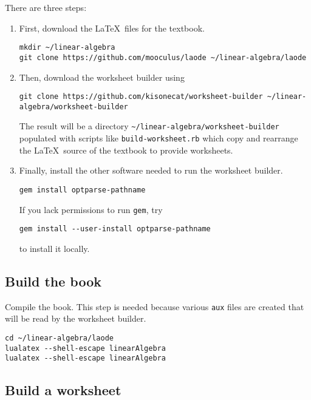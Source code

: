 \documentclass{article}
\begin{document}
There are three steps:
\begin{enumerate}[\bfseries(a)]
\item First, download the \LaTeX\ files for the textbook.

\begin{verbatim}
mkdir ~/linear-algebra
git clone https://github.com/mooculus/laode ~/linear-algebra/laode
\end{verbatim}

\item Then, download the worksheet builder using
\begin{verbatim}
git clone https://github.com/kisonecat/worksheet-builder ~/linear-algebra/worksheet-builder
\end{verbatim}
The result will be a directory
\verb|~/linear-algebra/worksheet-builder| populated with scripts like
\verb|build-worksheet.rb| which copy and rearrange the \LaTeX\ source
of the textbook to provide worksheets.

\item Finally, install the other software needed to run the worksheet builder.

\begin{verbatim}
gem install optparse-pathname
\end{verbatim}

If you lack permissions to run \texttt{gem}, try

\begin{verbatim}
gem install --user-install optparse-pathname
\end{verbatim}

to install it locally.
\end{enumerate}

\subsection{Build the book}\label{build-the-book}

Compile the book. This step is needed because various \texttt{aux} files
are created that will be read by the worksheet builder.

\begin{verbatim}
cd ~/linear-algebra/laode
lualatex --shell-escape linearAlgebra
lualatex --shell-escape linearAlgebra
\end{verbatim}

\subsection{Build a worksheet}\label{try-it}
\end{document}

